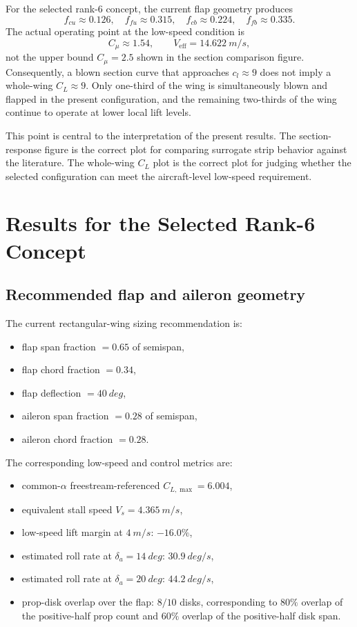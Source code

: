 \documentclass[conf]{new-aiaa}
\begin{document}
For the selected rank-6 concept, the current flap geometry produces
\begin{equation}
f_{cu} \approx 0.126,\quad
f_{fu} \approx 0.315,\quad
f_{cb} \approx 0.224,\quad
f_{fb} \approx 0.335.
\end{equation}
The actual operating point at the low-speed condition is
\begin{equation}
C_\mu \approx 1.54,\qquad
V_{\mathrm{eff}} = \SI{14.622}{m/s},
\end{equation}
not the upper bound \(C_\mu=2.5\) shown in the section comparison figure. Consequently, a blown section curve that approaches \(c_l \approx 9\) does not imply a whole-wing \(C_L \approx 9\). Only one-third of the wing is simultaneously blown and flapped in the present configuration, and the remaining two-thirds of the wing continue to operate at lower local lift levels.

This point is central to the interpretation of the present results. The section-response figure is the correct plot for comparing surrogate strip behavior against the literature. The whole-wing \(C_L\) plot is the correct plot for judging whether the selected configuration can meet the aircraft-level low-speed requirement.

\section{Results for the Selected Rank-6 Concept}

\subsection{Recommended flap and aileron geometry}

The current rectangular-wing sizing recommendation is:
\begin{itemize}
\item flap span fraction \(= 0.65\) of semispan,
\item flap chord fraction \(= 0.34\),
\item flap deflection \(= \SI{40}{deg}\),
\item aileron span fraction \(= 0.28\) of semispan,
\item aileron chord fraction \(= 0.28\).
\end{itemize}

The corresponding low-speed and control metrics are:
\begin{itemize}
\item common-\(\alpha\) freestream-referenced \(C_{L,\max} = 6.004\),
\item equivalent stall speed \(V_s = \SI{4.365}{m/s}\),
\item low-speed lift margin at \(\SI{4}{m/s}\): \(-16.0\%\),
\item estimated roll rate at \(\delta_a = \SI{14}{deg}\): \(\SI{30.9}{deg/s}\),
\item estimated roll rate at \(\delta_a = \SI{20}{deg}\): \(\SI{44.2}{deg/s}\),
\item prop-disk overlap over the flap: \(8/10\) disks, corresponding to \(80\%\) overlap of the positive-half prop count and \(60\%\) overlap of the positive-half disk span.
\end{itemize}
\end{document}
